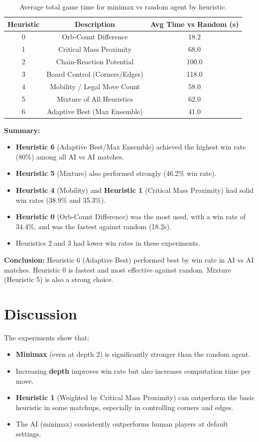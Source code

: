 \documentclass[11pt,a4paper]{article}
\begin{document}
\begin{table}[H]
\centering
\begin{tabular}{ccc}
\toprule
\textbf{Heuristic} & \textbf{Description} & \textbf{Avg Time vs Random (s)} \\
\midrule
0 & Orb-Count Difference & 18.2 \\
1 & Critical Mass Proximity & 68.0 \\
2 & Chain-Reaction Potential & 100.0 \\
3 & Board Control (Corners/Edges) & 118.0 \\
4 & Mobility / Legal Move Count & 58.0 \\
5 & Mixture of All Heuristics & 62.0 \\
6 & Adaptive Best (Max Ensemble) & 41.0 \\
\bottomrule
\end{tabular}
\caption{Average total game time for minimax vs random agent by heuristic.}
\end{table}

\textbf{Summary:}
\begin{itemize}
    \item \textbf{Heuristic 6} (Adaptive Best/Max Ensemble) achieved the highest win rate (80\%) among all AI vs AI matches.
    \item \textbf{Heuristic 5} (Mixture) also performed strongly (46.2\% win rate).
    \item \textbf{Heuristic 4} (Mobility) and \textbf{Heuristic 1} (Critical Mass Proximity) had solid win rates (38.9\% and 35.3\%).
    \item \textbf{Heuristic 0} (Orb-Count Difference) was the most used, with a win rate of 34.4\%, and was the fastest against random (18.2s).
    \item Heuristics 2 and 3 had lower win rates in these experiments.
\end{itemize}

\textbf{Conclusion:} Heuristic 6 (Adaptive Best) performed best by win rate in AI vs AI matches. Heuristic 0 is fastest and most effective against random. Mixture (Heuristic 5) is also a strong choice.
\pagebreak
\section{Discussion}
The experiments show that:
\begin{itemize}
  \item \textbf{Minimax} (even at depth 2) is significantly stronger than the random agent.
  \item Increasing \textbf{depth} improves win rate but also increases computation time per move.
  \item \textbf{Heuristic 1} (Weighted by Critical Mass Proximity) can outperform the basic heuristic in some matchups, especially in controlling corners and edges.
  \item The AI (minimax) consistently outperforms human players at default settings.
\end{itemize}
\end{document}

